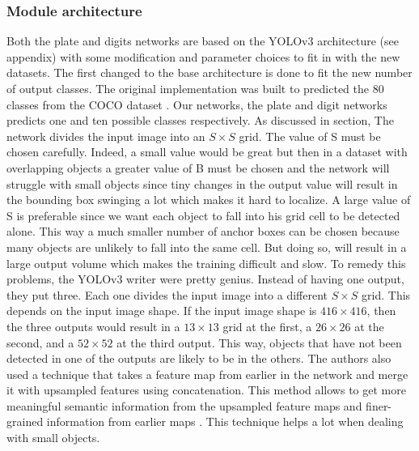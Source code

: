 \subsubsection{Module architecture}
Both the plate and digits networks are based on the YOLOv3 architecture (see appendix) with some modification and parameter choices to fit in with
the new datasets. The first changed to the base architecture is done to fit the new number of output classes. The original implementation was built to predicted the 80 classes from the COCO dataset \cite{YOLOv3}. Our networks, the plate and digit networks predicts one and ten possible classes respectively. As discussed in section, The network divides the input image into an $S \times S$ grid. The value of S must be chosen carefully. Indeed, a small value would be great but then in a dataset with overlapping objects a greater value of B must be chosen and the network will struggle with small objects since tiny changes in the output value will result in the bounding box swinging a lot which makes it hard to localize. A large value of S is preferable since we want each object to fall into his grid cell to be detected alone. This way a much smaller number of anchor boxes can be chosen because many objects are unlikely to fall into the same cell. But doing so, will result in a large output volume which makes the training difficult and slow. To remedy this problems, the YOLOv3 writer were pretty genius. Instead of having one output, they put three. Each one divides the input image into a different $S \times S$ grid. This depends on the input image shape. If the input image shape is $416 \times 416$, then the three outputs would result in a $13 \times 13$ grid at the first, a $26 \times 26$ at the second, and a $52 \times 52$ at the third output. This way, objects that have not been detected in one of the outputs are likely to be in the others. The authors also used a technique that takes a feature map from earlier in the network and merge it with upsampled features using concatenation. This method allows to get more meaningful semantic information from the upsampled feature maps and finer-grained information from earlier maps \cite{YOLOv3}. This technique helps a lot when dealing with small objects.

